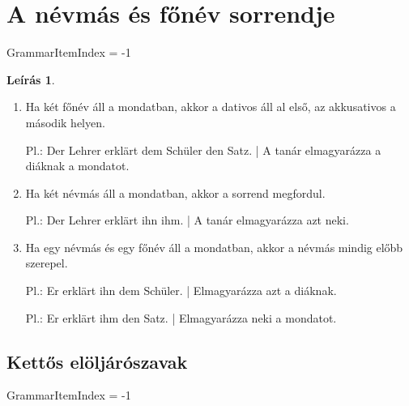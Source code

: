 \documentclass{article}
\theoremstyle{definition}
\newtheorem*{desc}{Leírás}
\begin{document}
\section{A névmás és főnév sorrendje}

GrammarItemIndex = -1

\begin{desc}
\begin{enumerate}
\item Ha két főnév áll a mondatban, akkor a dativos áll al első, az akkusativos a második helyen.

Pl.: Der Lehrer erklärt dem Schüler den Satz. | A tanár elmagyarázza a diáknak a mondatot.

\item Ha két névmás áll a mondatban, akkor a sorrend megfordul.

Pl.: Der Lehrer erklärt ihn ihm. | A tanár elmagyarázza azt neki.

\item Ha egy névmás és egy főnév áll a mondatban, akkor a névmás mindig előbb szerepel.

Pl.: Er erklärt ihn dem Schüler. | Elmagyarázza azt a diáknak.

Pl.: Er erklärt ihm den Satz. | Elmagyarázza neki a mondatot.
\end{enumerate}
\end{desc}

\subsection{Kettős elöljárószavak}

GrammarItemIndex = -1
\end{document}

